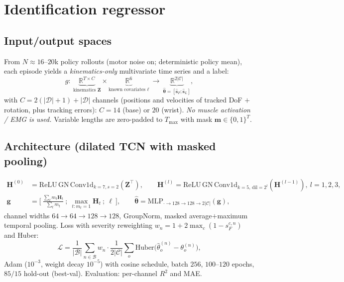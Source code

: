\documentclass[11pt]{article}
\newcommand{\R}{\mathbb{R}}
\newcommand{\Cset}{\mathcal{C}}
\newcommand{\Dset}{\mathcal{D}}
\renewcommand{\vec}[1]{\mathbf{#1}}
\begin{document}
\section{Identification regressor}
\subsection{Input/output spaces}
From $N\!\approx\!16$--$20$k policy rollouts (motor noise on; deterministic policy mean), each episode yields a \emph{kinematics-only} multivariate time series and a label:
\begin{equation}
g:\ \underbrace{\R^{T\times C}}_{\text{kinematics }\vec Z}\times\underbrace{\R^{6}}_{\text{known covariates }\boldsymbol\ell}\ \longrightarrow\ \underbrace{\R^{2|\Cset|}}_{\widehat{\boldsymbol\theta}=[\hat{\vec s}_F;\hat{\vec s}_L]},
\end{equation}
with $C=2(|\Dset|{+}1)+|\Dset|$ channels (positions and velocities of tracked DoF $+$ rotation, plus tracking errors): $C{=}14$ (base) or $20$ (wrist). \emph{No muscle activation / EMG is used.} Variable lengths are zero-padded to $T_{\max}$ with mask $\vec m\in\{0,1\}^{T}$.

\subsection{Architecture (dilated TCN with masked pooling)}
\begin{align}
\vec H^{(0)}&=\mathrm{ReLU}\,\mathrm{GN}\,\mathrm{Conv1d}_{k=7,s=2}(\vec Z^\top),\qquad
\vec H^{(l)}=\mathrm{ReLU}\,\mathrm{GN}\,\mathrm{Conv1d}_{k=5,\,\mathrm{dil}=2^{l}}(\vec H^{(l-1)}),\ l{=}1,2,3,\\
\vec g&=\Big[\ \tfrac{\sum_t m_t\vec H_t}{\sum_t m_t}\ ;\ \max_{t:m_t=1}\vec H_t\ ;\ \boldsymbol\ell\ \Big],\qquad
\widehat{\boldsymbol\theta}=\mathrm{MLP}_{\cdot\to128\to128\to 2|\Cset|}(\vec g),
\end{align}
channel widths $64\!\to\!64\!\to\!128\!\to\!128$, GroupNorm, masked average$+$maximum temporal pooling. Loss with severity reweighting $w_n=1+2\max_c(1-s_F^{c,n})$ and Huber:
\begin{equation}
\mathcal L=\frac{1}{|\mathcal B|}\sum_{n\in\mathcal B}w_n\cdot\frac{1}{2|\Cset|}\sum_o \mathrm{Huber}\big(\hat\theta^{(n)}_o-\theta^{(n)}_o\big),
\end{equation}
Adam ($10^{-3}$, weight decay $10^{-5}$) with cosine schedule, batch $256$, $100$--$120$ epochs, $85/15$ hold-out (best-val). Evaluation: per-channel $R^2$ and MAE.
\end{document}
